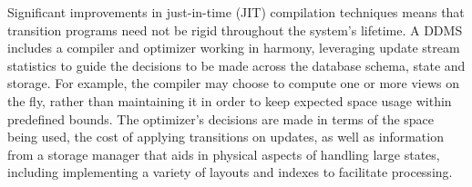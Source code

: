 
Significant improvements in just-in-time (JIT) compilation techniques means that
transition programs need not be rigid throughout the system's lifetime. A DDMS
includes a compiler and optimizer working in harmony, leveraging update stream
statistics to guide the decisions to be made across the database schema, state
and storage. For example, the compiler may choose to compute one or more views
on the fly, rather than maintaining it in order to keep expected space usage
within predefined bounds. The optimizer's decisions are made in terms of the
space being used, the cost of applying transitions on updates, as well as
information from a storage manager that aids in physical aspects of handling
large states, including implementing a variety of layouts and indexes to
facilitate processing.










